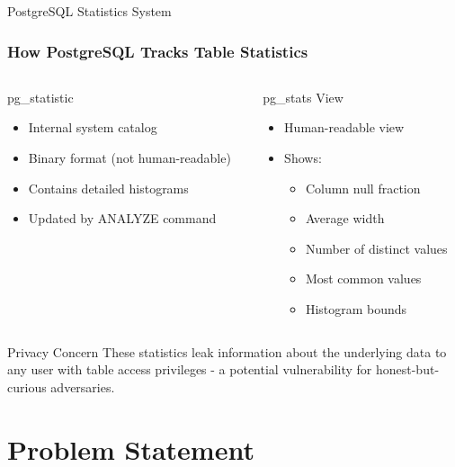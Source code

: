 \documentclass{beamer}
\begin{document}
\begin{frame}{PostgreSQL Statistics System}
\frametitle{How PostgreSQL Tracks Table Statistics}

\begin{columns}[T]
\begin{column}{0.5\textwidth}
\begin{block}{pg\_statistic}
\begin{itemize}
    \item Internal system catalog
    \item Binary format (not human-readable)
    \item Contains detailed histograms
    \item Updated by ANALYZE command
\end{itemize}
\end{block}
\end{column}

\begin{column}{0.5\textwidth}
\begin{block}{pg\_stats View}
\begin{itemize}
    \item Human-readable view
    \item Shows:
    \begin{itemize}
        \item Column null fraction
        \item Average width
        \item Number of distinct values
        \item Most common values
        \item Histogram bounds
    \end{itemize}
\end{itemize}
\end{block}
\end{column}
\end{columns}

\vspace{0.5cm}

\begin{alertblock}{Privacy Concern}
These statistics leak information about the underlying data to any user with table access privileges - a potential vulnerability for honest-but-curious adversaries.
\end{alertblock}

\end{frame}

\section{Problem Statement}
\end{document}
